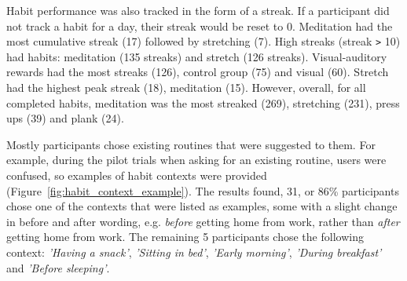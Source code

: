 Habit performance was also tracked in the form of a streak. If a participant did not track a habit for a day, their streak would be reset to 0. Meditation had the most cumulative streak (17) followed by stretching (7). High streaks (streak \verb|>| 10) had habits: meditation (135 streaks) and stretch (126 streaks). Visual-auditory rewards had the most streaks (126), control group (75) and visual (60). Stretch had the highest peak streak (18), meditation (15). However, overall, for all completed habits, meditation was the most streaked (269), stretching (231), press ups (39) and plank (24).

Mostly participants chose existing routines that were suggested to them. For example, during the pilot trials when asking for an existing routine, users were confused, so examples of habit contexts were provided (Figure~\ref{fig:habit_context_example}). The results found, 31, or 86\% participants chose one of the contexts that were listed as examples, some with a slight change in before and after wording, e.g. \textit{before} getting home from work, rather than \textit{after} getting home from work. The remaining 5 participants chose the following context: \textit{'Having a snack'}, \textit{'Sitting in bed'}, \textit{'Early morning'}, \textit{'During breakfast'} and \textit{'Before sleeping'}.

